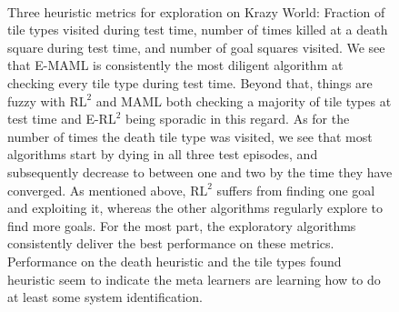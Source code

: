 \documentclass{article} %
\begin{document}
\begin{figure}[H]
\begin{center}
\hfill
{}\\
\end{center}
\caption{Three heuristic metrics for exploration on Krazy World: Fraction of tile types visited during test time, number of times killed at a death square during test time, and number of goal squares visited. We see that E-MAML is consistently the most diligent algorithm at checking every tile type during test time. Beyond that, things are fuzzy with $\text{RL}^2$ and MAML both checking a majority of tile types at test time and E-$\text{RL}^2$ being sporadic in this regard. As for the number of times the death tile type was visited, we see that most algorithms start by dying in all three test episodes, and subsequently decrease to between one and two by the time they have converged. As mentioned above, $\text{RL}^2$ suffers from finding one goal and exploiting it, whereas the other algorithms regularly explore to find more goals. For the most part, the exploratory algorithms consistently deliver the best performance on these metrics. Performance on the death heuristic and the tile types found heuristic seem to indicate the meta learners are learning how to do at least some system identification.}
\label{fig:hs}
\end{figure} 
\end{document}
